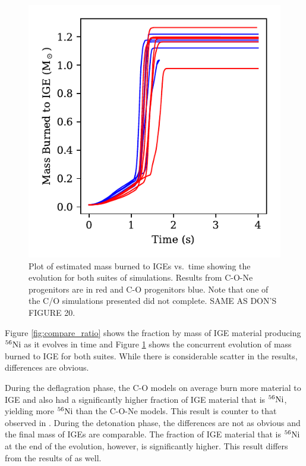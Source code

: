 \documentclass[iop,apj]{emulateapj}
\newcommand{\Ni}[1]{\ensuremath{{}^{#1}{\rm Ni}}}
\begin{document}
\begin{figure}
\includegraphics[width=\columnwidth]{figures/MBTI_v_time_plot.pdf}
\caption{\label{fig:compare_burned}
Plot of estimated mass burned to IGEs vs.\ time showing the evolution
for both suites of simulations. Results from C-O-Ne progenitors are 
in red and C-O progenitors blue.  
Note that one of the C/O simulations presented did not complete.
{\color{red} SAME AS DON'S FIGURE 20.} 
}
\end{figure}

Figure \ref{fig:compare_ratio} shows the fraction by mass of IGE
material producing \Ni{56} as it evolves in time and Figure
\ref{fig:compare_burned} shows the concurrent evolution of mass
burned to IGE for both suites. While there is considerable
scatter in the results, differences are obvious. 

During the deflagration phase, the C-O models
on average burn more material to IGE and also had a significantly higher
fraction of IGE material that is \Ni{56}, yielding more \Ni{56} than
the C-O-Ne models. This result is counter to that observed in
\citet{willcoxetal2016}. During the detonation phase, the differences
are not as obvious and the final mass of IGEs are comparable. The
fraction of IGE material that is \Ni{56} at the end of the evolution,
however, is significantly higher. This result differs from 
the results of \citet{willcoxetal2016} as well.
\end{document}
